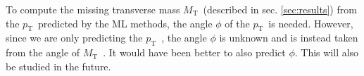\documentclass{scrartcl}
\newcommand{\pt}{\ensuremath{p_\text{T}}~}
\newcommand{\mt}{\ensuremath{M_\text{T}}~}
\begin{document}
To compute the missing transverse mass \mt (described in sec. \ref{sec:results}) from the \pt predicted by the \gls{ML} methods, the angle $\phi$ of the \pt is needed. However, since we are only predicting the \pt, the angle $\phi$ is unknown and is instead taken from the angle of \mt. It would have been better to also predict $\phi$. This will also be studied in the future.



\end{document}
